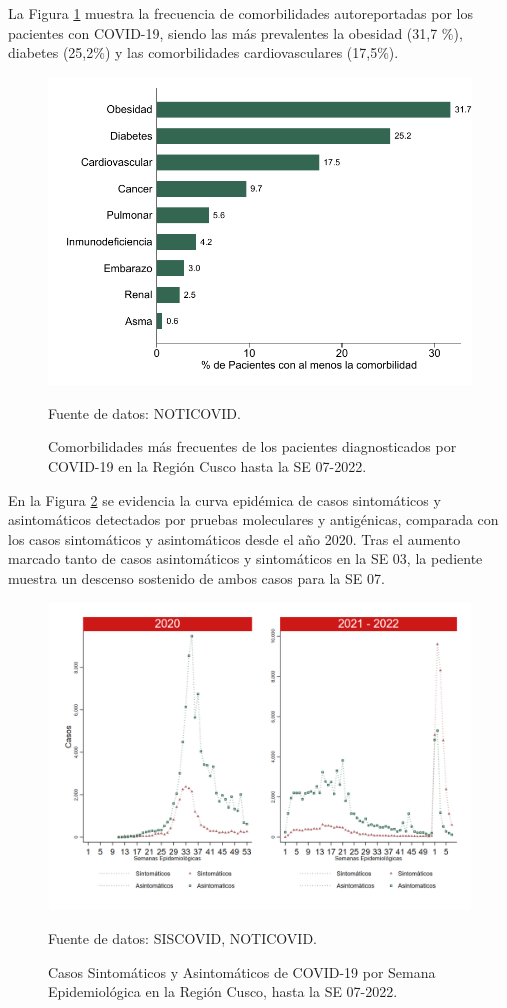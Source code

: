 \documentclass[12pt,a4paper,openany]{book}
\begin{document}
La Figura \ref{fig:comorbilidades} muestra la frecuencia de comorbilidades autoreportadas por los pacientes con COVID-19, siendo las más prevalentes la obesidad (31,7 $\%$), diabetes (25,2$\%$) y las comorbilidades cardiovasculares (17,5$\%$).  
\begin{figure}[h]
	\caption{Comorbilidades más frecuentes de los pacientes diagnosticados por COVID-19 en la Región Cusco hasta la SE 07-2022. }\label{fig:comorbilidades}
	\begin{center}
		\includegraphics[width=0.65\linewidth]{../figuras/figura_comorbilidad.pdf}
	\end{center}
	{\footnotesize {Fuente de datos: NOTICOVID.}}
\end{figure}
\clearpage
 En la Figura \ref{fig:sintomaticos_asintomati} se evidencia la curva epidémica de casos sintomáticos y asintomáticos detectados por pruebas moleculares y antigénicas, comparada con los casos sintomáticos y asintomáticos desde el año 2020. Tras el aumento marcado tanto de casos asintomáticos y sintomáticos en la SE 03, la pediente muestra un descenso sostenido de ambos casos para la SE 07. 
 
\begin{figure}[h]
	\caption{Casos Sintomáticos y Asintomáticos de COVID-19 por Semana Epidemiológica en la Región Cusco, hasta la SE 07-2022.  }\label{fig:sintomaticos_asintomati}
	
	\begin{center}
		\includegraphics[width=0.75\linewidth]{../figuras/sintomaticos_20_21_22.png}
	\end{center}
	{\footnotesize {Fuente de datos: SISCOVID, NOTICOVID.}}
\end{figure}
\clearpage
\end{document}
